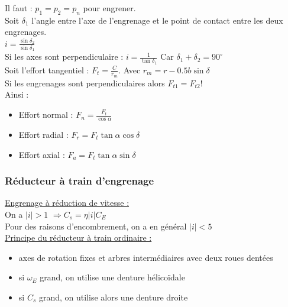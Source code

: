 \documentclass[../main.tex]{subfiles}
\begin{document}
Il faut : $p_1=p_2=p_n$ pour engrener.\\
Soit $\delta_1$ l'angle entre l'axe de l'engrenage et le point de contact entre les deux engrenages.\\
$i = \frac{\sin{\delta_2}}{\sin{\delta_1}}$\\
Si les axes sont perpendiculaire : $i = \frac{1}{\tan \delta_1}$ Car $\delta_1+\delta_2 = 90^\circ$\\

Soit l'effort tangentiel : $F_t = \frac{C}{r_m}$. Avec $r_m = r-0.5b\sin{\delta}$\\
\warning Si les engrenages sont perpendiculaires alors $F_{t1} = F_{t2}$!\\

Ainsi : \begin{itemize}
    \item Effort normal : $F_n = \frac{F_t}{\cos{\alpha}}$\\
    \item Effort radial : $F_r = F_t \tan\alpha \cos{\delta}$\\
    \item Effort axial : $F_a = F_t \tan\alpha \sin{\delta}$\\
\end{itemize}

\subsubsection{Réducteur à train d'engrenage}
\quad \underline{Engrenage à réduction de vitesse :}\\
On a $\lvert i \rvert >1$ $ \Rightarrow C_s = \eta \lvert i \rvert C_E$\\
Pour des raisons d'encombrement, on a en général $\lvert i \rvert < 5$\\

\quad \underline{Principe du réducteur à train ordinaire :}\\
\begin{itemize}
    \item axes de rotation fixes et arbres intermédiaires avec deux roues dentées\\
    \item si $\omega_E$ grand, on utilise une denture hélicoïdale\\
    \item si $C_s$ grand, on utilise alors une denture droite\\
\end{itemize}
\end{document}

